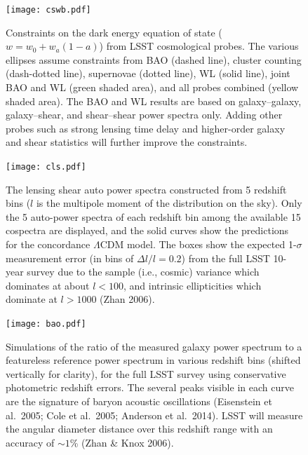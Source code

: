 \begin{figure}
\texttt{[image: cswb.pdf]}
\caption{
Constraints on the dark energy equation of state ($w = w_0 +
w_a(1-a)$) from LSST cosmological probes.  The various ellipses assume
constraints from BAO (dashed line), cluster counting (dash-dotted line), 
supernovae (dotted line), WL (solid line), joint BAO and WL 
(green shaded area), and all probes combined (yellow shaded area).
The BAO and WL results are based on galaxy--galaxy, galaxy--shear,
and shear--shear power spectra only. 
Adding other probes such as strong lensing time delay
and higher-order galaxy and shear statistics will further improve 
the constraints.} 
\label{Fig:DEellipses}
\end{figure}



\begin{figure}
\texttt{[image: cls.pdf]}
\caption{The lensing shear auto power spectra constructed from 5 redshift bins 
($l$ is the multipole moment of the distribution on the sky). Only the 5 auto-power 
spectra of each redshift bin among the available 15 cospectra are displayed, and the 
solid curves show the predictions for the concordance $\Lambda$CDM model. The boxes 
show the expected 1-$\sigma$ measurement error (in bins of $\Delta l/l=0.2$) from the full LSST 
10-year survey due to the sample (i.e., cosmic) variance which dominates at about 
$l< 100$, and intrinsic ellipticities which dominate at $l> 1000$ (Zhan 2006).} 
\label{Fig:wlPk}
\end{figure}


\begin{figure}
\texttt{[image: bao.pdf]}
\caption{Simulations of the ratio of the measured galaxy power spectrum to 
a featureless reference power spectrum in various redshift bins (shifted vertically 
for clarity), for the full LSST survey using conservative photometric redshift
errors. The several peaks visible in each curve are the signature of baryon acoustic 
oscillations (Eisenstein et al.~2005; Cole et al.~2005; Anderson et al.~2014). LSST will measure the 
angular diameter distance over this redshift range with an accuracy of $\sim1$\% 
(Zhan \& Knox 2006).} 
\label{Fig:bao}
\end{figure}



